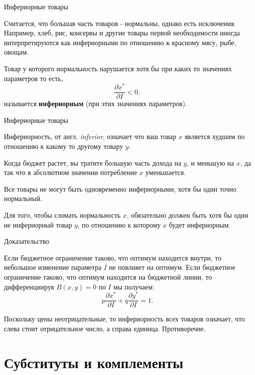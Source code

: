 \documentclass{beamer}
\begin{document}
\begin{frame}{Инфериорные товары}

Считается, что большая часть товаров - нормальны, однако есть исключения. Например, хлеб, рис, консервы и другие товары первой необходимости иногда интерпретируются как инфериорными по отношению к красному мясу, рыбе, овощам. 

\begin{definition}
Товар у которого нормальность нарушается хотя бы при каких то значениях параметров то есть, 
$$\frac{\partial x^{\ast}}{\partial I} < 0,$$ 
называется \textbf{инфериорным} (при этих значениях параметров). 
\end{definition}
\end{frame}

\begin{frame}{Инфериорные товары}

Инфериорность, от англ. \textit{inferior}, означает что ваш товар $x$ является худшим по отношению к какому то другому товару $y$. 

Когда бюджет растет, вы тратите большую часть дохода на $y$, и меньшую на $x$, да так что в абсолютном значении потребление $x$ уменьшается. 

\begin{lemma}
Все товары не могут быть одновременно инфериорными, хотя бы один точно нормальный.
\end{lemma}

Для того, чтобы сломать нормальность $x$, обязательно должен быть хотя бы один не инфериорный товар $y$, по отношению к которому $x$ будет инфериорным.

\end{frame}

\begin{frame}{Доказательство}

Если бюджетное ограничение таково, что оптимум находится внутри, то небольшое изменение параметра $I$ не повлияет на оптимум. Если бюджетное ограничение таково, что оптимум находится на бюджетной линии, то дифференциируя $B(x,y)= 0$ по $I$ мы получаем: 
$$ p \frac{\partial x^{\ast}}{\partial I}  + q \frac{\partial y^{\ast}}{\partial I}  = 1.$$ 

Поскольку цены неотрицательные, то инфериорность всех товаров означает, что слева стоит отрицательное число, а справа единица. Противоречие.

\end{frame}

\section{Субституты и комплементы}
\end{document}
